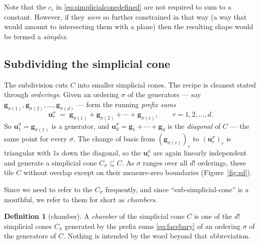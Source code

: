 \documentclass[11pt,a4paper]{article}
\theoremstyle{definition}
\newtheorem{definition}{Definition}[section]
\theoremstyle{plain}
\newcommand{\bvec}[1]{\mathbf{#1}}
\begin{document}
Note that the $c_i$ in \eqref{eq:simplicialconedefined}
 are not required to sum to a constant. However, if they \textit{were} so further constrained in that way (a way that would amount to intersecting them with a plane) then the resulting shape would be termed a \emph{simplex}.

\subsection{Subdividing the simplicial cone}

The subdivision cuts $C$ into smaller simplicial cones. The recipe is cleanest
stated through \emph{orderings}. Given an ordering $\sigma$ of the generators
--- say $\bvec g_{\sigma(1)},\bvec g_{\sigma(2)},\dots,\bvec g_{\sigma(d)}$ ---
form the running \emph{prefix sums}
\begin{equation}\label{eq:facebary}
   \bvec u^{\sigma}_r \;=\; \bvec g_{\sigma(1)}+\bvec g_{\sigma(2)}
            +\cdots+\bvec g_{\sigma(r)},
   \qquad r=1,2,\dots,d .
\end{equation}
So $\bvec u^\sigma_1=\bvec g_{\sigma(1)}$ is a generator, and $\bvec u^\sigma_d
=\bvec g_1+\cdots+\bvec g_d$ is the \emph{diagonal} of $C$ --- the same point
for every $\sigma$. The change of basis from $(\bvec g_{\sigma(r)})_r$ to
$(\bvec u^\sigma_r)_r$ is triangular with $1$s down the diagonal, so the $\bvec
u^\sigma_r$ are again linearly independent and generate a simplicial cone
$C_\sigma\subseteq C$. As $\sigma$ ranges over all $d!$ orderings, these tile
$C$ without overlap except on their measure-zero boundaries
(Figure~\ref{fig:sd}).

Since we need to refer to the $C_\sigma$ frequently, and since ``sub-simplicial-cone'' is a
mouthful, we refer to them for short as \emph{chambers}.

\begin{definition}[chamber]\label{def:chamber}
A \emph{chamber} of the simplicial cone $C$ is one of the $d!$ simplicial cones
$C_\sigma$ generated by the prefix sums \eqref{eq:facebary} of an ordering
$\sigma$ of the generators of $C$. Nothing is intended by the word beyond that
abbreviation.
\end{definition}
\end{document}
